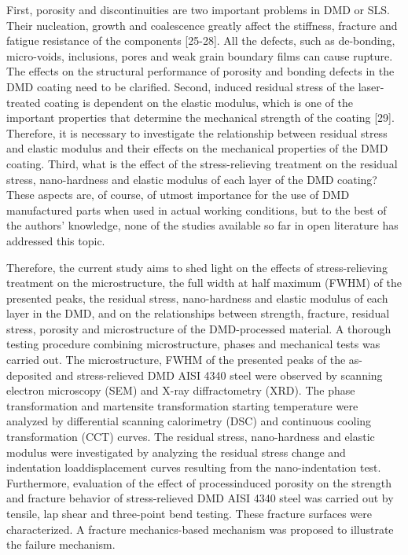 \documentclass[10pt]{article}
\begin{document}
First, porosity and discontinuities are two important problems in DMD or SLS. Their nucleation, growth and coalescence greatly affect the stiffness, fracture and fatigue resistance of the components [25-28]. All the defects, such as de-bonding, micro-voids, inclusions, pores and weak grain boundary films can cause rupture. The effects on the structural performance of porosity and bonding defects in the DMD coating need to be clarified. Second, induced residual stress of the laser-treated coating is dependent on the elastic modulus, which is one of the important properties that determine the mechanical strength of the coating [29]. Therefore, it is necessary to investigate the relationship between residual stress and elastic modulus and their effects on the mechanical properties of the DMD coating. Third, what is the effect of the stress-relieving treatment on the residual stress, nano-hardness and elastic modulus of each layer of the DMD coating? These aspects are, of course, of utmost importance for the use of DMD manufactured parts when used in actual working conditions, but to the best of the authors' knowledge, none of the studies available so far in open literature has addressed this topic.

Therefore, the current study aims to shed light on the effects of stress-relieving treatment on the microstructure, the full width at half maximum (FWHM) of the presented peaks, the residual stress, nano-hardness and elastic modulus of each layer in the DMD, and on the relationships between strength, fracture, residual stress, porosity and microstructure of the DMD-processed material. A thorough testing procedure combining microstructure, phases and mechanical tests was carried out. The microstructure, FWHM of the presented peaks of the as-deposited and stress-relieved DMD AISI 4340 steel were observed by scanning electron microscopy (SEM) and X-ray diffractometry (XRD). The phase transformation and martensite transformation starting temperature were analyzed by differential scanning calorimetry (DSC) and continuous cooling transformation (CCT) curves. The residual stress, nano-hardness and elastic modulus were investigated by analyzing the residual stress change and indentation loaddisplacement curves resulting from the nano-indentation test. Furthermore, evaluation of the effect of processinduced porosity on the strength and fracture behavior of stress-relieved DMD AISI 4340 steel was carried out by tensile, lap shear and three-point bend testing. These fracture surfaces were characterized. A fracture mechanics-based mechanism was proposed to illustrate the failure mechanism.
\end{document}
